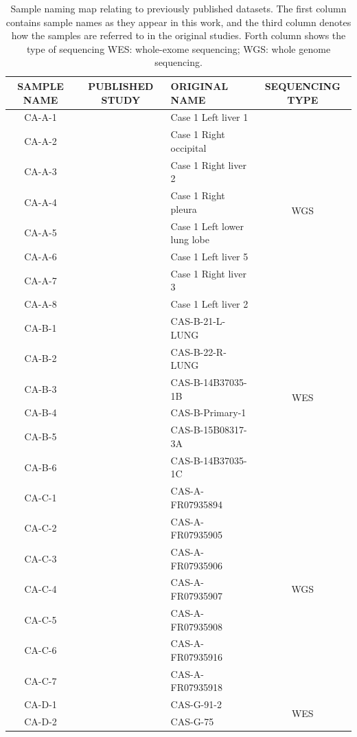 \begin{table}[!ht]
\caption[Sample name mapping]{Sample naming map relating to previously published datasets. The first column contains sample names as they appear in this work, and the third column denotes how the samples are referred to in the original studies. Forth column shows the type of sequencing WES: whole-exome sequencing; WGS: whole genome sequencing.}\label{A:tab:S1}
\centering
\footnotesize
\begin{tabular}{c|c|l|c}
\textbf{SAMPLE NAME} & \textbf{PUBLISHED STUDY} & \textbf{ORIGINAL NAME} & \textbf{SEQUENCING TYPE} \\
\hline
CA-A-1	& \multirow{8}{*}{\citeauthor*{Solomon2020} \cite{Solomon2020}} &  Case 1 Left liver 1	& \multirow{8}{*}{WGS} \\
CA-A-2	& &	Case 1 Right occipital & \\
CA-A-3	& &	Case 1 Right liver 2	 &\\
CA-A-4	& &	Case 1 Right pleura	 &\\
CA-A-5	& &	Case 1 Left lower lung lobe	 &\\
CA-A-6	& &	Case 1 Left liver 5	 &\\
CA-A-7	& &	Case 1 Right liver 3	 &\\
CA-A-8	& &	Case 1 Left liver 2	 &\\
\hline
CA-B-1 & \multirow{47}{*}{\citeauthor*{Vergara2021} \cite{Vergara2021}} & CAS-B-21-L-LUNG & \multirow{6}{*}{WES} \\ 
CA-B-2 & & CAS-B-22-R-LUNG	&  \\ 
CA-B-3 & & CAS-B-14B37035-1B &  \\ 
CA-B-4 & & CAS-B-Primary-1 &  \\ 
CA-B-5 & & CAS-B-15B08317-3A &  \\ 
CA-B-6 & & CAS-B-14B37035-1C &  \\ 
\cline{1-1}\cline{3-4}
CA-C-1 & & CAS-A-FR07935894 & \multirow{7}{*}{WGS} \\ 
CA-C-2 & & CAS-A-FR07935905 &  \\ 
CA-C-3 & & CAS-A-FR07935906 &  \\ 
CA-C-4 & & CAS-A-FR07935907 &  \\ 
CA-C-5 & & CAS-A-FR07935908 &  \\ 
CA-C-6 & & CAS-A-FR07935916 &  \\ 
CA-C-7 & & CAS-A-FR07935918 &  \\ 
\cline{1-1}\cline{3-4}
CA-D-1 & & CAS-G-91-2 & \multirow{8}{*}{WES}\\ 
CA-D-2 & & CAS-G-75 &  \\ 

\end{tabular}
\end{table}
